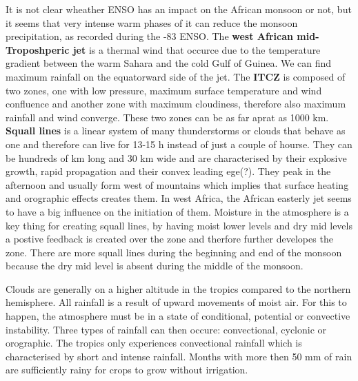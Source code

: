 \documentclass{article}
\begin{document}
	It is not clear wheather ENSO has an impact on the African monsoon or not, but it seems that very intense warm phases of it can reduce the monsoon precipitation, as recorded during the -83 ENSO. The \textbf{west African mid-Troposhperic jet} is a thermal wind that occurce due to the temperature gradient between the warm Sahara and the cold Gulf of Guinea. We can find maximum rainfall on the equatorward side of the jet. The \textbf{ITCZ} is composed of two zones, one with low pressure, maximum surface temperature and wind confluence and another zone with maximum cloudiness, therefore also maximum rainfall and wind converge. These two zones can be as far aprat as 1000 km. 
	\textbf{Squall lines} is a linear system of many thunderstorms or clouds that behave as one and therefore can live for 13-15 h instead of just a couple of hourse. They can be hundreds of km long and 30 km wide and are characterised by their explosive growth, rapid propagation and their convex leading ege(?). They peak in the afternoon and usually form west of mountains which implies that surface heating and orographic  effects creates them. In west Africa, the African easterly jet seems to have a big influence on the initiation of them. Moisture in the atmosphere is a key thing for creating squall lines, by having moist lower levels and dry mid levels a postive feedback is created over the zone and therfore further developes the zone. There are more squall lines during the beginning and end of the monsoon because the dry mid level is absent during the middle of the monsoon. 
	
	Clouds are generally on a higher altitude in the tropics compared to the northern hemisphere. All rainfall is a result of upward movements of moist air. For this to happen, the atmosphere must be in a state of conditional, potential or convective instability. Three types of rainfall can then occure: convectional, cyclonic or orographic. The tropics only experiences convectional rainfall which is characterised by short and intense rainfall. Months with more then 50 mm of rain are sufficiently rainy for crops to grow without irrigation.
	
\end{document}
